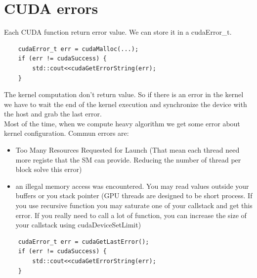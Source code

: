 \documentclass{article}
\begin{document}
\section{CUDA errors}
Each CUDA function return error value. We can store it in a cudaError\_t.
\begin{lstlisting}
	cudaError_t err = cudaMalloc(...);
	if (err != cudaSuccess) {
		std::cout<<cudaGetErrorString(err);
	}
\end{lstlisting}
The kernel computation don't return value. So if there is an error in the kernel we have to wait the end of the kernel execution and synchronize the device with the host and grab the last error.\\
Most of the time, when we compute heavy algorithm we get some error about kernel configuration. Commun errors are:
\begin{itemize}
	\item Too Many Resources Requested for Launch (That mean each thread need more registe that the SM can provide. Reducing the number of thread per block solve this error)
	\item an illegal memory access was encountered. You may read values outside your buffers or you stack pointer (GPU threads are designed to be short process. If you use recursive function you may saturate one of your callstack and get this error. If you really need to call a lot of function, you can increase the size of your callstack using cudaDeviceSetLimit)
\end{itemize}
\begin{lstlisting}
	cudaError_t err = cudaGetLastError();
	if (err != cudaSuccess) {
		std::cout<<cudaGetErrorString(err);
	}
\end{lstlisting}
\end{document}
